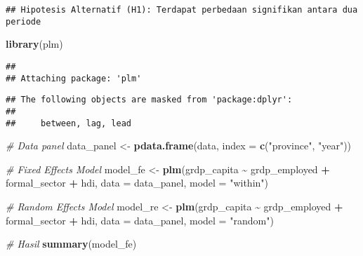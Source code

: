 \documentclass[
]{article}
\newenvironment{Shaded}{\begin{snugshade}}{\end{snugshade}}
\newcommand{\AttributeTok}[1]{\textcolor[rgb]{0.13,0.29,0.53}{#1}}
\newcommand{\CommentTok}[1]{\textcolor[rgb]{0.56,0.35,0.01}{\textit{#1}}}
\newcommand{\FunctionTok}[1]{\textcolor[rgb]{0.13,0.29,0.53}{\textbf{#1}}}
\newcommand{\NormalTok}[1]{#1}
\newcommand{\OtherTok}[1]{\textcolor[rgb]{0.56,0.35,0.01}{#1}}
\newcommand{\SpecialCharTok}[1]{\textcolor[rgb]{0.81,0.36,0.00}{\textbf{#1}}}
\newcommand{\StringTok}[1]{\textcolor[rgb]{0.31,0.60,0.02}{#1}}
\begin{document}
\begin{verbatim}
## Hipotesis Alternatif (H1): Terdapat perbedaan signifikan antara dua periode
\end{verbatim}

\begin{Shaded}
\begin{Highlighting}[]
\FunctionTok{library}\NormalTok{(plm)}
\end{Highlighting}
\end{Shaded}

\begin{verbatim}
## 
## Attaching package: 'plm'
\end{verbatim}

\begin{verbatim}
## The following objects are masked from 'package:dplyr':
## 
##     between, lag, lead
\end{verbatim}

\begin{Shaded}
\begin{Highlighting}[]
\CommentTok{\# Data panel}
\NormalTok{data\_panel }\OtherTok{\textless{}{-}} \FunctionTok{pdata.frame}\NormalTok{(data, }\AttributeTok{index =} \FunctionTok{c}\NormalTok{(}\StringTok{"province"}\NormalTok{, }\StringTok{"year"}\NormalTok{))}

\CommentTok{\# Fixed Effects Model}
\NormalTok{model\_fe }\OtherTok{\textless{}{-}} \FunctionTok{plm}\NormalTok{(grdp\_capita }\SpecialCharTok{\textasciitilde{}}\NormalTok{ grdp\_employed }\SpecialCharTok{+}\NormalTok{ formal\_sector }\SpecialCharTok{+}\NormalTok{ hdi, }\AttributeTok{data =}\NormalTok{ data\_panel, }\AttributeTok{model =} \StringTok{"within"}\NormalTok{)}

\CommentTok{\# Random Effects Model}
\NormalTok{model\_re }\OtherTok{\textless{}{-}} \FunctionTok{plm}\NormalTok{(grdp\_capita }\SpecialCharTok{\textasciitilde{}}\NormalTok{ grdp\_employed }\SpecialCharTok{+}\NormalTok{ formal\_sector }\SpecialCharTok{+}\NormalTok{ hdi, }\AttributeTok{data =}\NormalTok{ data\_panel, }\AttributeTok{model =} \StringTok{"random"}\NormalTok{)}

\CommentTok{\# Hasil}
\FunctionTok{summary}\NormalTok{(model\_fe)}
\end{Highlighting}
\end{Shaded}
\end{document}
